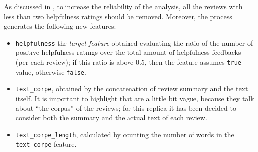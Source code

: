 \documentclass[a4paper]{article}
\begin{document}
		 	As discussed in \cite{article:muller}, to increase the reliability of the analysis, all the reviews with less than two helpfulness ratings should be removed. Moreover, the process generates the following new features:
		 	\begin{itemize}
		 		\item \verb*|helpfulness| the \emph{target feature} obtained evaluating the ratio of the number of positive helpfulness ratings over the total amount of helpfulness feedbacks (per each review); if this ratio is above 0.5, then the feature assumes \verb*|true| value, otherwise \verb*|false|.
		 		\item \verb*|text_corpe|, obtained by the concatenation of review summary and the text itself. It is important to highlight that \citeauthor{article:muller} are a little bit vague, because they talk about ``the corpus'' of the reviews; for this replica it has been decided to consider both the summary and the actual text of each review.
		 		\item \verb*|text_corpe_length|, calculated by counting the number of words in the \verb*|text_corpe| feature. 
		 	\end{itemize} 
	 	
\end{document}
